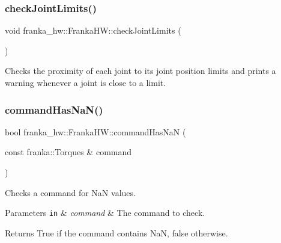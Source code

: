 \subsubsection{\texorpdfstring{check\+Joint\+Limits()}{checkJointLimits()}}
{\footnotesize\ttfamily void franka\+\_\+hw\+::\+Franka\+H\+W\+::check\+Joint\+Limits (\begin{DoxyParamCaption}{ }\end{DoxyParamCaption})\hspace{0.3cm}{\ttfamily [virtual]}}

Checks the proximity of each joint to its joint position limits and prints a warning whenever a joint is close to a limit. \mbox{\label{classfranka__hw_1_1_franka_h_w_a673cc620d6acb15625f6403d96c75f4e}} 
\subsubsection{\texorpdfstring{command\+Has\+Na\+N()}{commandHasNaN()}\hspace{0.1cm}{\footnotesize\ttfamily [1/5]}}
{\footnotesize\ttfamily bool franka\+\_\+hw\+::\+Franka\+H\+W\+::command\+Has\+NaN (\begin{DoxyParamCaption}\item[{const franka\+::\+Torques \&}]{command }\end{DoxyParamCaption})\hspace{0.3cm}{\ttfamily [static]}}

Checks a command for NaN values.


\begin{DoxyParams}[1]{Parameters}
\mbox{\tt in}  & {\em command} & The command to check.\\
\hline
\end{DoxyParams}
\begin{DoxyReturn}{Returns}
True if the command contains NaN, false otherwise. 
\end{DoxyReturn}
\mbox{\label{classfranka__hw_1_1_franka_h_w_a32f7dda7266b381a4c779993b4d0185f}} 
